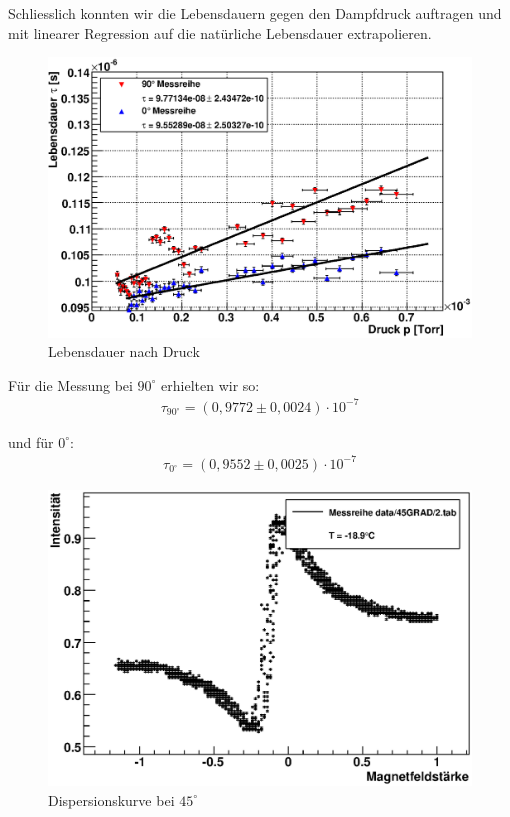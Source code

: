 \documentclass[12pt]{article}
\begin{document}
Schliesslich konnten wir die Lebensdauern gegen den Dampfdruck auftragen und mit linearer Regression auf die natürliche Lebensdauer extrapolieren.

\begin{figure}[H]  
\centering
\includegraphics[width=0.9\linewidth]{pictures/lebensdauer_druck.eps}
\caption{Lebensdauer nach Druck}
\end{figure}

Für die Messung bei $90^\circ$ erhielten wir so:
\begin{align}
 \tau_{90^\circ} = (0,9772 \pm 0,0024) \cdot 10^{-7}
\end{align}

und für $0^\circ$:
\begin{align}
 \tau_{0^\circ} = (0,9552 \pm 0,0025) \cdot 10^{-7}
\end{align}


\begin{figure}[H]  
\centering
\includegraphics[width=0.9\linewidth]{pictures/dispersion.eps}
\caption{Dispersionskurve bei $45^\circ$}
\end{figure}
\end{document}

